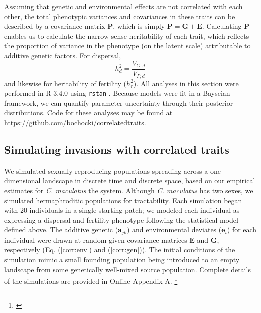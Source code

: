 \documentclass[11pt]{article}
\newcommand{\tom}[1]{{\textit{\color{WildStrawberry}{[#1]}}}}
\def\code#1{\texttt{#1}}
\begin{document}
Assuming that genetic and environmental effects are not correlated with each other, the total phenotypic variances and covariances in these traits can be described by a covariance matrix $\bm{P}$, which is simply $\bm{P} = \bm{G} + \bm{E}$.
Calculating $\bm{P}$ enables us to calculate the narrow-sense heritability of each trait, which reflects the proportion of variance in the phenotype (on the latent scale) attributable to additive genetic factors.
For dispersal,
%
\begin{equation}\label{corr:heritability}
  h^{2}_d = \frac{V_{G,d}}{V_{P,d}}
\end{equation}
%
and likewise for heritability of fertility ($h^{2}_r$).
All analyses in this section were performed in R 3.4.0 \citep{r_core_team_r:_2015} using \code{rstan} \citep{stan_development_team_rstan:_2015}.
Because models were fit in a Bayseian framework, we can quantify parameter uncertainty through their posterior distributions.
Code for these analyses may be found at \url{https://github.com/bochocki/correlatedtraits}.

\subsection*{Simulating invasions with correlated traits}
We simulated sexually-reproducing populations spreading across a one-dimensional landscape in discrete time and discrete space, based on our empirical estimates for \textit{C. maculatus} the system.
Although \textit{C. maculatus} has two sexes, we simulated hermaphroditic populations for tractability.
Each simulation began with 20 individuals in a single starting patch; we modeled each individual as expressing a dispersal and fertility phenotype following the statistical model defined above.
The additive genetic ($\bm{a}_{jk}$) and environmental deviates ($\bm{e}_i$) for each individual were drawn at random given covariance matrices $\bm{E}$ and $\bm{G}$, respectively (Eq. (\ref{corr:env}) and (\ref{corr:gen})).
The initial conditions of the simulation mimic a small founding population being introduced to an empty landscape from some genetically well-mixed source population. 
Complete details of the simulations are provided in Online Appendix A.
\footnote{\tom{I think we need to say something about whether or not our model allows correlations to evolve. I think yes, based on previous conversations with Brad, but I am not sure how to explain how or why this is so. Brad, can you add a sentence to this effect?}}
\end{document}
